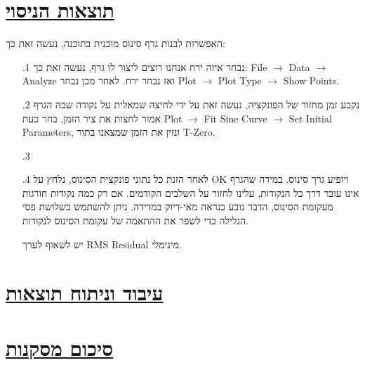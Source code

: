 \documentclass[a4paper, 12pt]{article}
\begin{document}
    \section{\underline{תוצאות הניסוי}}
    \begin{flushright}
        האפשרות לבנות גרף סינוס מובנית בתוכנה, נעשה זאת כך:
        \begin{enumerate}
            \item[.1] נבחר איזה ירח אנחנו רוצים ליצור לו גרף, נעשה זאת כך: 
            \textenglish{File $\rightarrow$ Data $\rightarrow$ Analyze} ואז נבחר ירח.
            לאחר מכן נבחר \textenglish{Plot $\rightarrow$ Plot Type $\rightarrow$ Show Points}.
            \item[.2] נקבע זמן מחזור של הפונקציה, נעשה זאת על ידי לחיצה שמאלית על נקודה שבה 
            הגרף אמור לחצות את ציר הזמן, בחר כעת 
            \textenglish{Plot $\rightarrow$ Fit Sine Curve $\rightarrow$ Set Initial Parameters},
            ונזין את הזמן שמצאנו בתור \textenglish{T-Zero}.
            \item[.3]
            \item[.4] לאחר הזנת כל נתוני פונקצית הסינוס, נלחץ על \textenglish{OK} ויופיע גרך סינוס.
            במידה שהגרף אינו עובר דרך כל הנקודות, עלינו לחזור על השלבים הקודמים. אם רק כמה נקודות
            חורגות מעקומת הסינוס, הדבר נובע כנראה מאי-דיוק במדידה.
            ניתן להשתמש בשלושת פסי הגלילה כדי לשפר את ההתאמה של עקומת הסינוס לנקודות.

            יש לשאוף לערך \textenglish{RMS Residual} מינימלי.
        \end{enumerate}
    \end{flushright}


    \pagebreak %

    \section{\underline{עיבוד וניתוח תוצאות}}
    \begin{flushright}

    \end{flushright}

    \pagebreak %

    \section{\underline{סיכום מסקנות}}
    \begin{flushright}

    \end{flushright}
\end{document}
